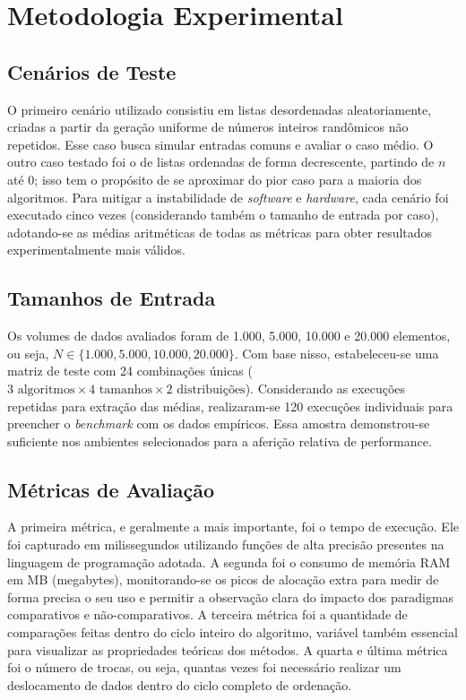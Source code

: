 \documentclass[12pt,a4paper]{article}
\begin{document}
\section{Metodologia Experimental}
\subsection{Cenários de Teste}
O primeiro cenário utilizado consistiu em listas desordenadas aleatoriamente, criadas a partir da geração uniforme de números inteiros randômicos não repetidos. Esse caso busca simular entradas comuns e avaliar o caso médio. O outro caso testado foi o de listas ordenadas de forma decrescente, partindo de $n$ até $0$; isso tem o propósito de se aproximar do pior caso para a maioria dos algoritmos. Para mitigar a instabilidade de \textit{software} e \textit{hardware}, cada cenário foi executado cinco vezes (considerando também o tamanho de entrada por caso), adotando-se as médias aritméticas de todas as métricas para obter resultados experimentalmente mais válidos.

\subsection{Tamanhos de Entrada}
Os volumes de dados avaliados foram de 1.000, 5.000, 10.000 e 20.000 elementos, ou seja, $N \in \{1.000, 5.000, 10.000, 20.000\}$. Com base nisso, estabeleceu-se uma matriz de teste com 24 combinações únicas ($3 \text{ algoritmos} \times 4 \text{ tamanhos} \times 2 \text{ distribuições}$). Considerando as execuções repetidas para extração das médias, realizaram-se 120 execuções individuais para preencher o \textit{benchmark} com os dados empíricos. Essa amostra demonstrou-se suficiente nos ambientes selecionados para a aferição relativa de performance.

\subsection{Métricas de Avaliação}
A primeira métrica, e geralmente a mais importante, foi o tempo de execução. Ele foi capturado em milissegundos utilizando funções de alta precisão presentes na linguagem de programação adotada. A segunda foi o consumo de memória RAM em MB (megabytes), monitorando-se os picos de alocação extra para medir de forma precisa o seu uso e permitir a observação clara do impacto dos paradigmas comparativos e não-comparativos. A terceira métrica foi a quantidade de comparações feitas dentro do ciclo inteiro do algoritmo, variável também essencial para visualizar as propriedades teóricas dos métodos. A quarta e última métrica foi o número de trocas, ou seja, quantas vezes foi necessário realizar um deslocamento de dados dentro do ciclo completo de ordenação.
\end{document}
